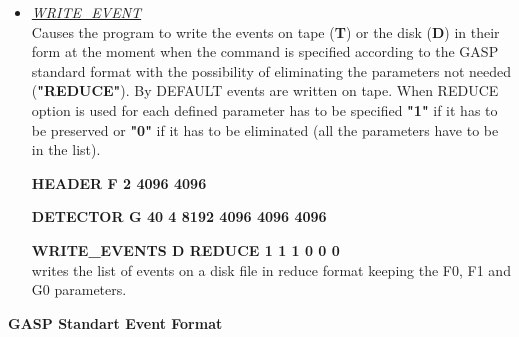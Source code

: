 \begin{itemize}
	Defines gates on all the parameters of the specified type ({\bf "P"}).
	All the gates has to be satisfied in order to declare the event valid.

	\hskip1cm {\bf WINDOW F 320 4095 220 4095 } \\
	gates have been set on all the HEADER type parameters F. Gates are set
	on the first two parameters (F0 and F1). The rest of them (\#pars-2)
	are completely opened (from 0 to maximum dimension).

 \item	{\it\underline{WRITE\_EVENT}} \\

	Causes the program to write the events on tape ({\bf T}) or the
	disk ({\bf D}) in their form at the moment when the command is
	specified according to the GASP standard format with the 
	possibility of eliminating the parameters not needed ({\bf "REDUCE"}).
	By DEFAULT events are written on tape.
	When REDUCE option is used for each defined parameter has to
	be specified {\bf "1"} if it has to be preserved or {\bf "0"} if it 
	has to 
	be eliminated (all the parameters have to be in the list).

	\hskip1cm{\bf HEADER F 2 4096 4096} 

	\hskip1cm{\bf DETECTOR G 40 4 8192 4096 4096 4096} 

	\hskip1cm{\bf WRITE\_EVENTS D REDUCE 1 1 1 0 0 0} \\
	writes the list of events on a disk file in reduce format
	keeping the F0, F1 and G0 parameters.

\end{itemize}



\newpage


\begin{center}
{\bf GASP Standart Event Format }
\end{center}

